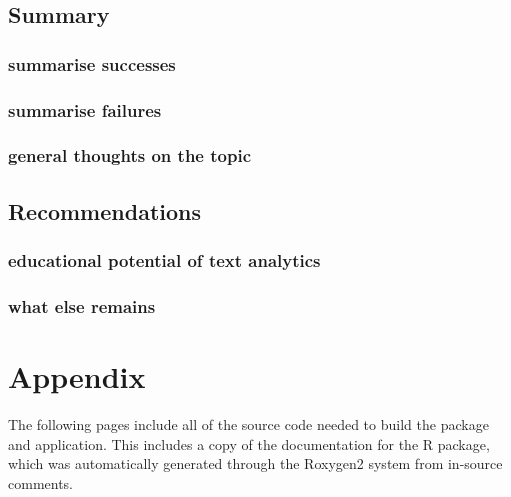 \documentclass[11pt, a4paper, twoside, titlepage]{report}
\begin{document}
\section{Summary}\label{sec:summary}

\subsection{summarise successes}
\subsection{summarise failures}
\subsection{general thoughts on the topic}

\section{Recommendations}\label{sec:recommendations}

\subsection{educational potential of text analytics}
\subsection{what else remains}

\appendix
\chapter{Appendix}\label{cha:appendix}

The following pages include all of the source code needed to build the
package and application. This includes a copy of the documentation for
the R package, which was automatically generated through the Roxygen2
system from in-source comments.



%   
\end{document}
